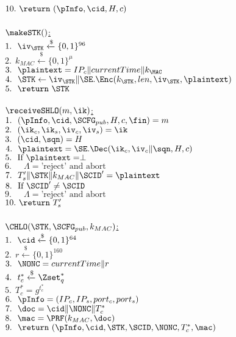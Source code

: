  $10.\  \return\ (\pInfo, \cid, H, c)$ \\
\\
\underline{$\makeSTK()$:} \\
 $1.\ \ \iv_{\STK} \xleftarrow{\$} \{0,1\}^{96}$ \\
 $2.\ \ k_{MAC} \xleftarrow{\$} \{0,1\}^{\mu}$ \\
 $3.\ \ \plaintext = IP_c \| currentTime \| k_{\MAC}$ \\
 $4.\ \ \STK \leftarrow \iv_{\STK} \| \SE.\Enc(k_{\STK}, len, \iv_{\STK}, \plaintext)$ \\
 $5.\ \ \return\ \STK$ \\
\\
\underline{$\receiveSHLO(m, \ik)$:} \\
 $1.\ \ (\pInfo, \cid, \SCFG_{pub}, H, c, \fin) = m$ \\
 $2.\ \ (\ik_c, \ik_s, \iv_c, \iv_s) = \ik$ \\
 $3.\ \ (\cid, \sqn) = H$ \\
 $4.\ \ \plaintext = \SE.\Dec(\ik_c, \iv_c \| \sqn, H, c)$ \\
 $5.\ \ \text{If }\plaintext = \perp$ \\
 $6.\ \ \quad \Lambda = \text{'reject' and abort}$ \\
 $7.\ \ T_{s}^{\prime} \| \STK \| k_{MAC} \| \SCID^{\prime} = \plaintext $ \\
 $8.\ \ \text{If }\SCID^{\prime} \neq \SCID$ \\
 $9.\ \ \quad \Lambda = \text{'reject' and abort}$ \\
 $10.\  \return\ T_s^{\prime}$ \\
\\
\newpage
\noindent
\underline{$\CHLO(\STK, \SCFG_{pub}, k_{MAC})$:} \\
 $1.\ \ \cid \xleftarrow{\$} \{0,1\}^{64}$ \\
 $2.\ \ r \xleftarrow{\$} \{0,1\}^{160}$ \\
 $3.\ \ \NONC = currentTime \| r$ \\
 $4.\ \ t_c^{\ast} \xleftarrow{\$} \Zset_{q}^{\ast}$ \\
 $5.\ \ T_c^{\ast} = g^{t_c^{\ast}}$ \\
 $6.\ \ \pInfo = (IP_c, IP_s, port_c, port_s)$ \\
 $7.\ \ \doc = \cid \| \NONC \| T_c^{\ast}$ \\
 $8.\ \ \mac = \PRF(k_{MAC}, \doc) $ \\
 $9.\ \ \return\ (\pInfo, \cid, \STK, \SCID, \NONC, T_c^{\ast}, \mac)$ \\
